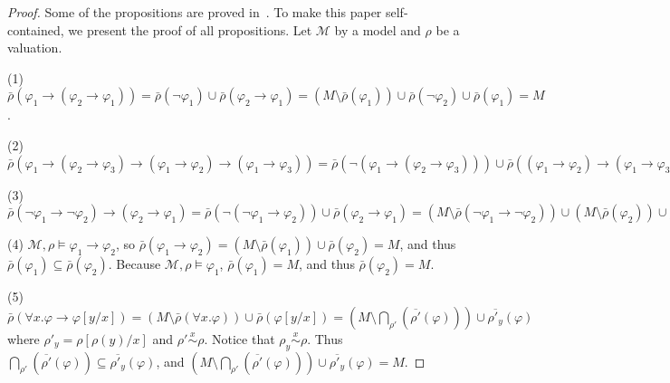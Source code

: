 \documentclass[acmsmall]{acmart}
\theoremstyle{acmdefinition}
\newcommand{\imp}{\to}
\newcommand{\MM}{\mathcal{M}}
\newcommand{\widebar}[1]{\overline{#1}}
\newcommand{\rhox}[1]{{\rho_{#1}}}
\newcommand{\rhop}{\rho'}
\newcommand{\rhopx}[1]{{\rhop_{#1}}}
\newcommand{\barrho}{\bar{\rho}}
\newcommand{\barrhop}{\widebar{\rhop}}
\newcommand{\barrhopx}[1]{\widebar{\rhopx{#1}}}
\newcommand{\simon}[1]{\overset{#1}{\sim}}
\begin{document}
\begin{proof}
	Some of the propositions are proved in~\cite{rosu-2017-lmcs}.
	To make this paper self-contained, we present the proof of all propositions.
	Let $\MM$ by a model and $\rho$ be a valuation.
	
	(1)
	$\barrho(\varphi_1 \imp (\varphi_2 \imp \varphi_1))
	= \barrho(\neg \varphi_1)
	\cup
	\barrho(\varphi_2 \imp \varphi_1)
	= (M \setminus \barrho(\varphi_1))
	\cup \barrho(\neg \varphi_2)
	\cup \barrho(\varphi_1)
	= M$.
	
	(2)
	$\barrho(\varphi_1 \imp (\varphi_2 \imp \varphi_3)
	\imp (\varphi_1 \imp \varphi_2)
	\imp (\varphi_1 \imp \varphi_3))
	= \barrho(\neg (\varphi_1 \imp (\varphi_2 \imp \varphi_3)))
	\cup
	\barrho((\varphi_1 \imp \varphi_2)
	\imp (\varphi_1 \imp \varphi_3))
	= (\barrho(\varphi_1) 
	\cap (\barrho(\neg (\varphi_2 \imp \varphi_3)))
	\cup
	\barrho(\neg (\varphi_1 \imp \varphi_2))
	\cup
	\barrho(\varphi_1 \imp \varphi_3)
	= (\barrho(\varphi_1) 
	\cap \barrho(\varphi_2) 
	\cap (M \setminus \barrho(\varphi_3)))
	\cup
	(\barrho(\varphi_1) \cap (M \setminus \barrho(\varphi_2)))
	\cup (M \setminus \barrho(\varphi_1)) \cup \barrho(\varphi_3)
	= M.
	$
	
	(3)
	$\barrho(\neg \varphi_1 \imp \neg \varphi_2)
	\imp (\varphi_2 \imp \varphi_1)
	= \barrho(\neg (\neg \varphi_1 \imp \varphi_2))
	\cup
	\barrho(\varphi_2 \imp \varphi_1)
	= (M \setminus \barrho(\neg \varphi_1 \imp \neg \varphi_2))
	\cup
	(M \setminus \barrho(\varphi_2))
	\cup \barrho(\varphi_1)
	= (M \setminus ( \barrho(\neg \neg \varphi_1) \cup \barrho(\neg \varphi_2)))
	\cup
	(M \setminus \barrho(\varphi_2))
	\cup \barrho(\varphi_1)
	= (M \setminus ( (M \setminus M \setminus \barrho(\varphi_1))
	\cup (M \setminus \barrho(\varphi_2))))
	\cup
	(M \setminus \barrho(\varphi_2))
	\cup \barrho(\varphi_1)
	= (M \setminus ( \barrho(\varphi_1)
	\cup (M \setminus \barrho(\varphi_2))))
	\cup
	(M \setminus \barrho(\varphi_2))
	\cup \barrho(\varphi_1)
	= M.
	$
	
	(4)
	$\MM,\rho \vDash \varphi_1 \imp \varphi_2$,
	so 
	$\barrho(\varphi_1 \imp \varphi_2) 
	= (M \setminus \barrho(\varphi_1)) \cup \barrho(\varphi_2) = M$,
	and thus $\barrho(\varphi_1) \subseteq \barrho(\varphi_2)$.
	Because $\MM,\rho \vDash \varphi_1$,
	$\barrho(\varphi_1) = M$,
	and thus $\barrho(\varphi_2) = M$.
	
	(5)
	$\barrho(\forall x . \varphi \imp \varphi[y/x])
	= (M \setminus \barrho(\forall x . \varphi)) \cup \barrho(\varphi[y/x])
	= (M \setminus \bigcap_{\rhop} (\barrhop(\varphi)) )
	\cup \barrhopx{y}(\varphi)
	$
	where $\rhopx{y} = \rho[\rho(y) /x]$
	and $\rhop \simon{x} \rho$.
	Notice that $\rhox{y} \simon{x} \rho$.
	Thus $\bigcap_{\rhop} (\barrhop(\varphi)) \subseteq \barrhopx{y}(\varphi)$,
	and $ (M \setminus \bigcap_{\rhop} (\barrhop(\varphi)) )
	\cup \barrhopx{y}(\varphi) = M$.
	

\end{proof}
\end{document}

